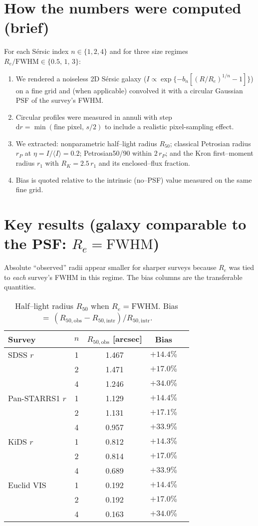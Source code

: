 \documentclass[12pt]{article}
\begin{document}
\section*{How the numbers were computed (brief)}
For each Sérsic index $n\in\{1,2,4\}$ and for three size regimes $R_e/\mathrm{FWHM}\in\{0.5,\,1,\,3\}$:
\begin{enumerate}
\item We rendered a noiseless 2D Sérsic galaxy ($I\!\propto\!\exp\{-b_n[(R/R_e)^{1/n}-1]\}$) on a fine grid and (when applicable) convolved it with a circular Gaussian PSF of the survey’s FWHM.
\item Circular profiles were measured in annuli with step $\mathrm{d}r=\min(\text{fine pixel},\, s/2)$ to include a realistic pixel-sampling effect.
\item We extracted: nonparametric half–light radius $R_{50}$; classical Petrosian radius $r_P$ at $\eta=I/\langle I\rangle=0.2$; Petrosian50/90 within $2\,r_P$; and the Kron first–moment radius $r_1$ with $R_K=2.5\,r_1$ and its enclosed–flux fraction.
\item Bias is quoted relative to the intrinsic (no–PSF) value measured on the same fine grid.
\end{enumerate}

\section*{Key results (galaxy comparable to the PSF: $R_e=\mathrm{FWHM}$)}
Absolute “observed” radii appear smaller for sharper surveys because $R_e$ was tied to \emph{each} survey’s FWHM in this regime. The bias columns are the transferable quantities.

\begin{table}[t]
\centering
\small
\caption{Half–light radius $R_{50}$ when $R_e=\mathrm{FWHM}$. Bias $=\,(R_{50,\mathrm{obs}}-R_{50,\mathrm{intr}})/R_{50,\mathrm{intr}}$.}
\begin{tabular}{lcccc}
\hline
Survey & $n$ & $R_{50,\mathrm{obs}}$ [arcsec] & Bias \\
\hline
SDSS $r$ & 1 & 1.467 & $+14.4\%$ \\
         & 2 & 1.471 & $+17.0\%$ \\
         & 4 & 1.246 & $+34.0\%$ \\
Pan-STARRS1 $r$ & 1 & 1.129 & $+14.4\%$ \\
                 & 2 & 1.131 & $+17.1\%$ \\
                 & 4 & 0.957 & $+33.9\%$ \\
KiDS $r$ & 1 & 0.812 & $+14.3\%$ \\
         & 2 & 0.814 & $+17.0\%$ \\
         & 4 & 0.689 & $+33.9\%$ \\
Euclid VIS & 1 & 0.192 & $+14.4\%$ \\
           & 2 & 0.192 & $+17.0\%$ \\
           & 4 & 0.163 & $+34.0\%$ \\
\hline
\end{tabular}
\end{table}
\end{document}
